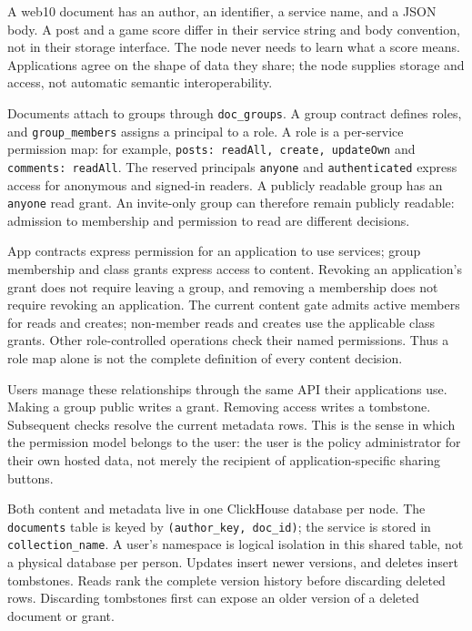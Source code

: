\documentclass[sigconf, nonacm]{acmart}
\begin{document}
A web10 document has an author, an identifier, a service name, and a
JSON body. A post and a game score differ in their service string and
body convention, not in their storage interface. The node never needs
to learn what a score means. Applications agree on the shape of data
they share; the node supplies storage and access, not automatic semantic
interoperability.

Documents attach to groups through \texttt{doc\_groups}. A group contract
defines roles, and \texttt{group\_members} assigns a principal to a role.
A role is a per-service permission map: for example,
\texttt{posts: readAll, create, updateOwn} and
\texttt{comments: readAll}. The reserved principals \texttt{anyone} and
\texttt{authenticated} express access for anonymous and signed-in
readers. A publicly readable group has an \texttt{anyone} read grant.
An invite-only group can therefore remain publicly readable: admission
to membership and permission to read are different decisions.

App contracts express permission for an application to use services;
group membership and class grants express access to content. Revoking
an application's grant does not require leaving a group, and removing a
membership does not require revoking an application. The current content
gate admits active members for reads and creates; non-member reads and
creates use the applicable class grants. Other role-controlled operations
check their named permissions. Thus a role map alone is not the complete
definition of every content decision.

Users manage these relationships through the same API their applications
use. Making a group public writes a grant. Removing access writes a
tombstone. Subsequent checks resolve the current metadata rows. This is
the sense in which the permission model belongs to the user: the user is
the policy administrator for their own hosted data, not merely the
recipient of application-specific sharing buttons.

Both content and metadata live in one ClickHouse database per node.
The \texttt{documents} table is keyed by \texttt{(author\_key, doc\_id)};
the service is stored in \texttt{collection\_name}. A user's namespace is
logical isolation in this shared table, not a physical database per
person. Updates insert newer versions, and deletes insert tombstones.
Reads rank the complete version history before discarding deleted rows.
Discarding tombstones first can expose an older version of a deleted
document or grant.
\end{document}
